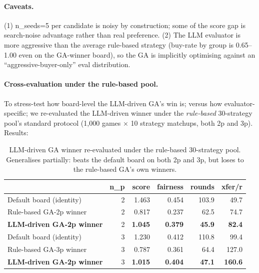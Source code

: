 \documentclass[10pt]{article}
\begin{document}
\paragraph{Caveats.} (1) n\_seeds=5 per candidate is noisy by
construction; some of the score gap is search-noise advantage rather
than real preference. (2) The LLM evaluator is more aggressive than
the average rule-based strategy (buy-rate by group is 0.65--1.00 even
on the GA-winner board), so the GA is implicitly optimising against
an ``aggressive-buyer-only'' eval distribution.

\paragraph{Cross-evaluation under the rule-based pool.} To stress-test
how board-level the LLM-driven GA's win is; versus how
evaluator-specific; we re-evaluated the LLM-driven winner under the
\emph{rule-based} 30-strategy pool's standard protocol (1{,}000 games
× 10 strategy matchups, both 2p and 3p). Results:

\begin{table}[h!]
\centering
\small
\begin{tabular}{lrrrrr}
\toprule
                              & n\_p & score  & fairness & rounds & xfer/r \\
\midrule
Default board (identity)      & 2    & 1.463  & 0.454    & 103.9  & 49.7 \\
Rule-based GA-2p winner       & 2    & 0.817  & 0.237    & 62.5   & 74.7 \\
\textbf{LLM-driven GA-2p winner} & 2 & \textbf{1.045} & \textbf{0.379} & \textbf{45.9} & \textbf{82.4} \\
\midrule
Default board (identity)      & 3    & 1.230  & 0.412    & 110.8  & 99.4 \\
Rule-based GA-3p winner       & 3    & 0.787  & 0.361    & 64.4   & 127.0 \\
\textbf{LLM-driven GA-2p winner} & 3 & \textbf{1.015} & \textbf{0.404} & \textbf{47.1} & \textbf{160.6} \\
\bottomrule
\end{tabular}
\caption{LLM-driven GA winner re-evaluated under the rule-based
30-strategy pool. Generalises partially: beats the default board on
both 2p and 3p, but loses to the rule-based GA's own winners.}
\label{tab:llm_ga_cross_eval}
\end{table}
\end{document}
